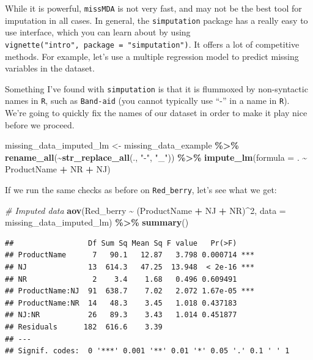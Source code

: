 \documentclass[
]{book}
\newenvironment{Shaded}{\begin{snugshade}}{\end{snugshade}}
\newcommand{\AttributeTok}[1]{\textcolor[rgb]{0.13,0.29,0.53}{#1}}
\newcommand{\CommentTok}[1]{\textcolor[rgb]{0.56,0.35,0.01}{\textit{#1}}}
\newcommand{\DecValTok}[1]{\textcolor[rgb]{0.00,0.00,0.81}{#1}}
\newcommand{\FunctionTok}[1]{\textcolor[rgb]{0.13,0.29,0.53}{\textbf{#1}}}
\newcommand{\NormalTok}[1]{#1}
\newcommand{\OtherTok}[1]{\textcolor[rgb]{0.56,0.35,0.01}{#1}}
\newcommand{\SpecialCharTok}[1]{\textcolor[rgb]{0.81,0.36,0.00}{\textbf{#1}}}
\newcommand{\StringTok}[1]{\textcolor[rgb]{0.31,0.60,0.02}{#1}}
\begin{document}
While it is powerful, \texttt{missMDA} is not very fast, and may not be the best tool for imputation in all cases. In general, the \texttt{simputation} package has a really easy to use interface, which you can learn about by using \texttt{vignette("intro",\ package\ =\ "simputation")}. It offers a lot of competitive methods. For example, let's use a multiple regression model to predict missing variables in the dataset.

Something I've found with \texttt{simputation} is that it is flummoxed by non-syntactic names in \texttt{R}, such as \texttt{Band-aid} (you cannot typically use ``-'' in a name in \texttt{R}). We're going to quickly fix the names of our dataset in order to make it play nice before we proceed.

\begin{Shaded}
\begin{Highlighting}[]
\NormalTok{missing\_data\_imputed\_lm }\OtherTok{\textless{}{-}}
\NormalTok{  missing\_data\_example }\SpecialCharTok{\%\textgreater{}\%}
  \FunctionTok{rename\_all}\NormalTok{(}\SpecialCharTok{\textasciitilde{}}\FunctionTok{str\_replace\_all}\NormalTok{(., }\StringTok{"{-}"}\NormalTok{, }\StringTok{"\_"}\NormalTok{)) }\SpecialCharTok{\%\textgreater{}\%}
  \FunctionTok{impute\_lm}\NormalTok{(}\AttributeTok{formula =}\NormalTok{ . }\SpecialCharTok{\textasciitilde{}}\NormalTok{ ProductName }\SpecialCharTok{+}\NormalTok{ NR }\SpecialCharTok{+}\NormalTok{ NJ)}
\end{Highlighting}
\end{Shaded}

If we run the same checks as before on \texttt{Red\_berry}, let's see what we get:

\begin{Shaded}
\begin{Highlighting}[]
\CommentTok{\# Imputed data}
\FunctionTok{aov}\NormalTok{(Red\_berry }\SpecialCharTok{\textasciitilde{}}\NormalTok{ (ProductName }\SpecialCharTok{+}\NormalTok{ NJ }\SpecialCharTok{+}\NormalTok{ NR)}\SpecialCharTok{\^{}}\DecValTok{2}\NormalTok{, }
    \AttributeTok{data =}\NormalTok{ missing\_data\_imputed\_lm) }\SpecialCharTok{\%\textgreater{}\%}
  \FunctionTok{summary}\NormalTok{()}
\end{Highlighting}
\end{Shaded}

\begin{verbatim}
##                 Df Sum Sq Mean Sq F value   Pr(>F)    
## ProductName      7   90.1   12.87   3.798 0.000714 ***
## NJ              13  614.3   47.25  13.948  < 2e-16 ***
## NR               2    3.4    1.68   0.496 0.609491    
## ProductName:NJ  91  638.7    7.02   2.072 1.67e-05 ***
## ProductName:NR  14   48.3    3.45   1.018 0.437183    
## NJ:NR           26   89.3    3.43   1.014 0.451877    
## Residuals      182  616.6    3.39                     
## ---
## Signif. codes:  0 '***' 0.001 '**' 0.01 '*' 0.05 '.' 0.1 ' ' 1
\end{verbatim}
\end{document}
